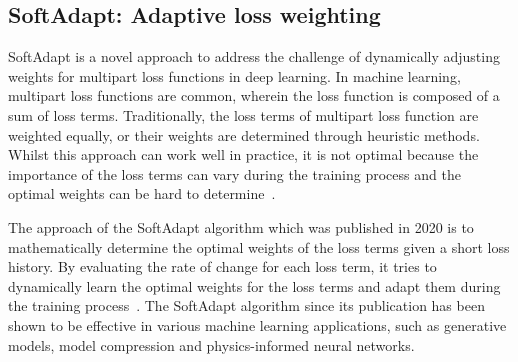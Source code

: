 \subsection{SoftAdapt: Adaptive loss weighting}

SoftAdapt is a novel approach to address the challenge of dynamically adjusting weights for multipart loss functions in deep learning. 
In machine learning, multipart loss functions are common, wherein the loss function is composed of a sum of loss terms. Traditionally, the loss terms of multipart loss function are weighted equally, or their weights are determined through heuristic methods. Whilst this approach can work well in practice, it is not optimal because the importance of the loss terms can vary during the training process and the optimal weights can be hard to determine~\cite{softadapt}.

The approach of the SoftAdapt algorithm which was published in 2020 is to mathematically determine the optimal weights of the loss terms given a short loss history. By evaluating the rate of change for each loss term, it tries to dynamically learn the optimal weights for the loss terms and adapt them during the training process~\cite{softadapt}. The SoftAdapt algorithm since its publication has been shown to be effective in various machine learning applications, such as generative models, model compression and physics-informed neural networks.














